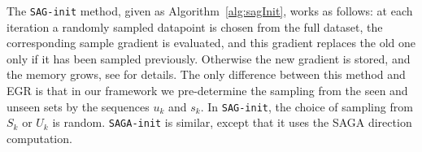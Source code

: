 \documentclass[11pt]{article}
\begin{document}
 The \texttt{SAG-init} method, given as Algorithm~\ref{alg:sagInit}, works as follows: at each iteration a randomly sampled datapoint is chosen from the full dataset, the corresponding sample gradient is evaluated, and this gradient replaces the old one only if it has been sampled previously. Otherwise the new gradient is stored, and the memory grows, see \cite{roux2012stochastic} for details. The only difference between this method and EGR is that in our framework we pre-determine the sampling from the seen and unseen sets by the sequences $u_k$ and $s_k$. In \texttt{SAG-init}, the choice of sampling from $S_k$ or $U_k$ is random. \texttt{SAGA-init} is similar, except that it uses the SAGA direction computation.
 
 
%
%
\end{document}
